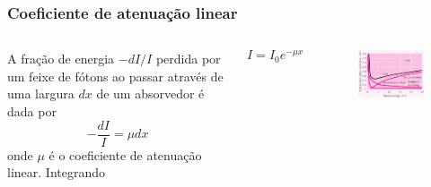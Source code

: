 \documentclass[12pt,brazil]{beamer}
\begin{document}

\begin{frame}
  \frametitle{Coeficiente de atenuação linear}
    \begin{columns}[c]


      \column{5cm}        
      \fontsize{8pt}{11pt}\selectfont
      
      A fração de energia $-dI/I$ perdida por um feixe de fótons ao passar através de uma largura $dx$ de um absorvedor é dada por
      \[
       -\dfrac{dI}{I} = \mu dx
      \]
      onde $\mu$ é o coeficiente de atenuação linear.  Integrando
      
      \[
        I = I_0 e^{-\mu x}
      \]
      
      \column{5cm}
        \vspace*{-1cm}
        \begin{figure}
          \hspace*{-.5cm}\includegraphics[width=6cm]{figuras/fig27}
        \end{figure}
    \end{columns}  

\end{frame}

\end{document}
